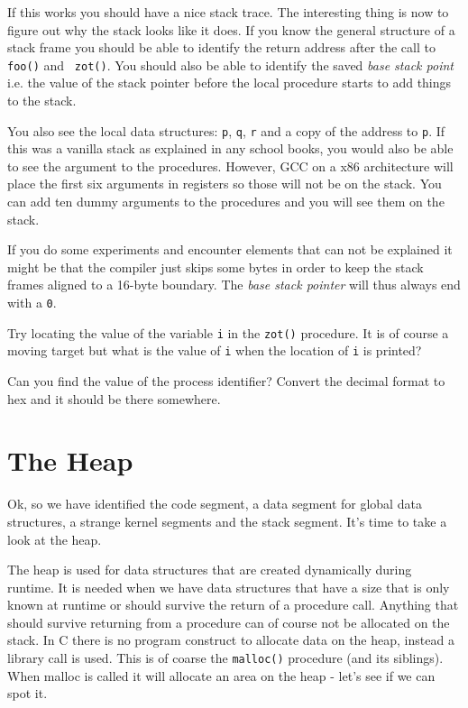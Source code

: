 \documentclass[a4paper,11pt]{article}
\begin{document}
If this works you should have a nice stack trace. The interesting
thing is now to figure out why the stack looks like it does. If you
know the general structure of a stack frame you should be able to
identify the return address after the call to {\tt foo()} and {\tt
  zot()}. You should also be able to identify the saved {\em base
  stack point} i.e. the value of the stack pointer before the local
procedure starts to add things to the stack.

You also see the local data structures: {\tt p}, {\tt q}, {\tt r} and a
copy of the address to {\tt p}.  If this was a vanilla stack as
explained in any school books, you would also be able to see the
argument to the procedures. However, GCC on a x86 architecture will
place the first six arguments in registers so those will not be on the
stack. You can add ten dummy arguments to the procedures and you will
see them on the stack.

If you do some experiments and encounter elements that can not be
explained it might be that the compiler just skips some bytes in order
to keep the stack frames aligned to a 16-byte boundary. The {\em base
  stack pointer} will thus always end with a {\tt 0}.

Try locating the value of the variable {\tt i} in the {\tt zot()}
procedure. It is of course a moving target but what is the value of
{\tt i} when the location of {\tt i} is printed?

Can you find the value of the process identifier? Convert the decimal
format to hex and it should be there somewhere.

\section{The Heap}

Ok, so we have identified the code segment, a data segment for global
data structures, a strange kernel segments and the stack segment. It's
time to take a look at the heap.

The heap is used for data structures that are created dynamically
during runtime. It is needed when we have data structures that have a
size that is only known at runtime or should survive the return of a
procedure call. Anything that should survive returning from a
procedure can of course not be allocated on the stack. In C there is
no program construct to allocate data on the heap, instead a library
call is used. This is of coarse the {\tt malloc()} procedure (and its
siblings). When malloc is called it will allocate an area on the heap
- let's see if we can spot it.
\end{document}
